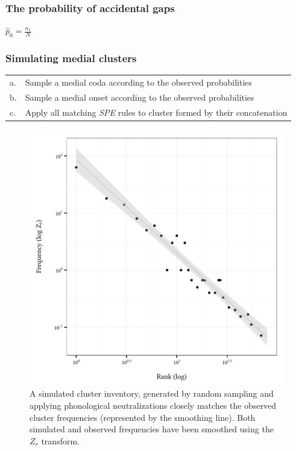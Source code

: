 \subsubsection{The probability of accidental gaps}

\begin{unlabeledexample}
$\displaystyle \hat{p}_0 = \frac{n_1}{N}$
\end{unlabeledexample}


\subsubsection{Simulating medial clusters}

\begin{example}
\begin{tabular}{l l}
a. & Sample a medial coda according to the observed probabilities  \\
b. & Sample a medial onset according to the observed probabilities \\
c. & Apply all matching \emph{SPE} rules to cluster formed by their concatenation \\
\end{tabular}
\end{example}

\begin{figure}
\centering
\includegraphics{sim.pdf}
\caption{A simulated cluster inventory, generated by random sampling and applying phonological neutralizations closely matches the observed cluster frequencies (represented by the smoothing line). Both simulated and observed frequencies have been smoothed using the $Z_r$ transform.}
\label{sim}
\end{figure}

